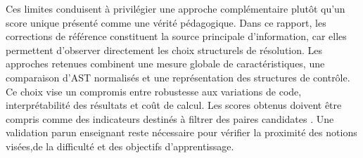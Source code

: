 \documentclass[12pt,a4paper,oneside]{report}
\begin{document}
Ces limites conduisent à privilégier une approche complémentaire plutôt qu'un
score unique présenté comme une vérité pédagogique. Dans ce rapport, les
corrections de référence constituent la source principale d'information, car
elles permettent d'observer directement les choix structurels de résolution.
Les approches retenues combinent une mesure globale de caractéristiques, une
comparaison d'AST normalisés et une représentation des structures de contrôle.
Ce choix vise un compromis entre robustesse aux variations de code,
interprétabilité des résultats et coût de calcul. Les scores obtenus doivent
être compris comme des indicateurs destinés à filtrer des paires candidates
. Une validation parun enseignant reste nécessaire pour vérifier la proximité 
des notions visées,de la difficulté et des objectifs d'apprentissage.
\end{document}
